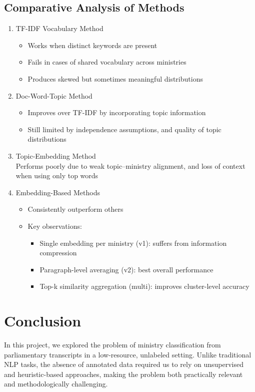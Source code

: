 \documentclass{report}
\begin{document}
\subsection{Comparative Analysis of Methods}
\begin{enumerate}
    \item TF-IDF Vocabulary Method
        \begin{itemize}
            \item Works when distinct keywords are present
            \item Fails in cases of shared vocabulary across ministries
            \item Produces skewed but sometimes meaningful distributions
        \end{itemize}
    \item Doc-Word-Topic Method
        \begin{itemize}
            \item Improves over TF-IDF by incorporating topic information
            \item Still limited by independence assumptions, and quality of topic distributions
        \end{itemize}
    \item Topic-Embedding Method \\
        Performs poorly due to weak topic–ministry alignment, and loss of context when using only top words
    \item Embedding-Based Methods
        \begin{itemize}
            \item Consistently outperform others
            \item Key observations:
                \begin{itemize}
                    \item Single embedding per ministry (v1): suffers from information compression
                    \item Paragraph-level averaging (v2): best overall performance
                    \item Top-k similarity aggregation (multi): improves cluster-level accuracy
                \end{itemize}
        \end{itemize}
\end{enumerate}

\section{Conclusion}
In this project, we explored the problem of ministry classification from parliamentary transcripts in a low-resource, unlabeled setting. Unlike traditional NLP tasks, the absence of annotated data required us to rely on unsupervised and heuristic-based approaches, making the problem both practically relevant and methodologically challenging.
\end{document}
